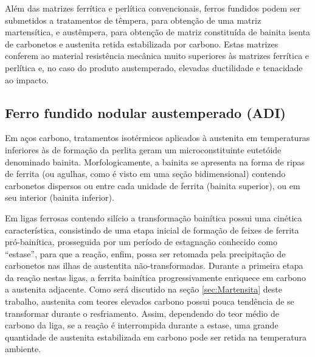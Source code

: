 Além das matrizes ferrítica e perlítica convencionais, ferros fundidos podem ser submetidos a tratamentos de têmpera, para obtenção de uma matriz martensítica, e austêmpera, para obtenção de matriz constituída de bainita isenta de carbonetos e austenita retida estabilizada por carbono. Estas matrizes conferem ao material resistência mecânica muito superiores às matrizes ferrítica e perlítica e, no caso do produto austemperado, elevadas ductilidade e tenacidade ao impacto\cite{Guesser2009}.

\subsection{Ferro fundido nodular austemperado (ADI)}

\label{subsec:ADI}

Em aços carbono, tratamentos isotérmicos aplicados à austenita em temperaturas inferiores às de formação da perlita geram um microconstituinte eutetóide denominado bainita. Morfologicamente, a bainita se apresenta na forma de ripas de ferrita (ou agulhas, como é visto em uma seção bidimensional) contendo carbonetos dispersos ou entre cada unidade de ferrita (bainita superior), ou em seu interior (bainita inferior).

Em ligas ferrosas contendo silício a transformação bainítica possui uma cinética característica, consistindo de uma etapa inicial de formação de feixes de ferrita pró-bainítica, prosseguida por um período de estagnação conhecido como ``estase'', para que a reação, enfim, possa ser retomada pela precipitação de carbonetos nas ilhas de austentita não-transformadas\cite{Goldenstein2002}. Durante a primeira etapa da reação nestas ligas, a ferrita bainítica progressivamente enriquece em carbono a austenita adjacente. Como será discutido na seção \ref{sec:Martensita} deste trabalho, austenita com teores elevados carbono possui pouca tendência de se transformar durante o resfriamento. Assim, dependendo do teor médio de carbono da liga, se a reação é interrompida durante a estase, uma grande quantidade de austenita estabilizada em carbono pode ser retida na temperatura ambiente.

